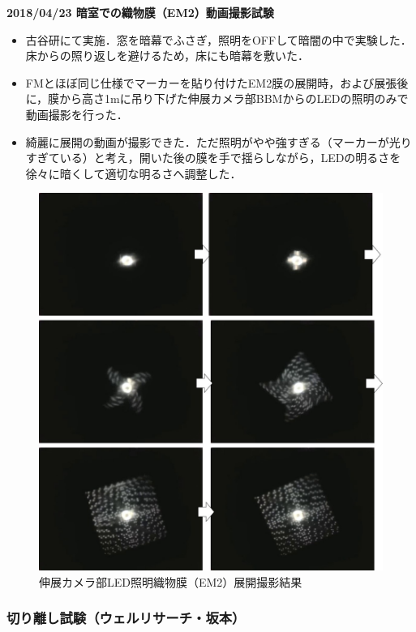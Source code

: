 \noindent \textbf{2018/04/23 暗室での織物膜（EM2）動画撮影試験}
\begin{itemize}
	\item 古谷研にて実施．窓を暗幕でふさぎ，照明をOFFして暗闇の中で実験した．床からの照り返しを避けるため，床にも暗幕を敷いた．
	\item FMとほぼ同じ仕様でマーカーを貼り付けたEM2膜の展開時，および展張後に，膜から高さ1mに吊り下げた伸展カメラ部BBMからのLEDの照明のみで動画撮影を行った．
	\item 綺麗に展開の動画が撮影できた．ただ照明がやや強すぎる（マーカーが光りすぎている）と考え，開いた後の膜を手で揺らしながら，LEDの明るさを徐々に暗くして適切な明るさへ調整した．
\end{itemize}
\begin{figure}[H]
	\centering
	\includegraphics[width=.8\textwidth]{03/fig/3-9-2-3-7.jpg}
	\caption{伸展カメラ部LED照明織物膜（EM2）展開撮影結果}
	\label{fig3-9-2-3-7}
\end{figure}


\subsubsection{切り離し試験（ウェルリサーチ・坂本）}

